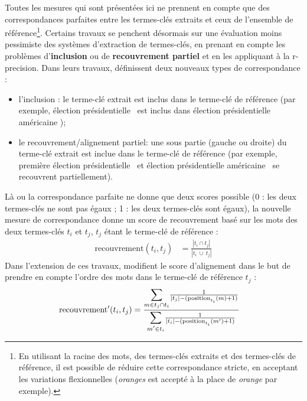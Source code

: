       Toutes les mesures qui sont présentées ici ne prennent en compte que des
      correspondances parfaites entre les termes-clés extraits et ceux de l'ensemble
      de référence\footnote{En utilisant la racine des mots, des termes-clés extraits et
      des termes-clés de référence, il est possible de réduire cette correspondance
      stricte, en acceptant les variations flexionnelles (\textit{oranges} est
      accepté à la place de \textit{orange} par exemple).}. Certains travaux se
      penchent désormais sur une évaluation moins pessimiste des systèmes
      d'extraction de termes-clés, en prenant en compte les problèmes
      d'\textbf{inclusion} ou de \textbf{recouvrement partiel}
      \citep{zesch2009rprecision, kim2010rprecision} et en les appliquant à la
      r-precision. Dans leurs travaux, \citet{zesch2009rprecision} définissent deux
      nouveaux types de correspondance :
      \begin{itemize}
        \item{l'inclusion : le terme-clé extrait est inclus dans le terme-clé de
              référence (par exemple, \og élection présidentielle \fg\ est inclus
              dans \og élection présidentielle américaine \fg);}
        \item{le recouvrement/alignement partiel: une sous partie (gauche ou
              droite) du terme-clé extrait est inclue dans le terme-clé de
              référence (par exemple, \og première élection présidentielle \fg\ et
              \og élection présidentielle américaine \fg\ se recouvrent
              partiellement).}
      \end{itemize}
      Là ou la correspondance parfaite ne donne que deux scores possible (0 : les
      deux termes-clés ne sont pas égaux ; 1 : les deux termes-clés sont égaux), la nouvelle
      mesure de correspondance donne un score de recouvrement basé sur les mots des
      deux termes-clés $t_i$ et $t_j$, $t_j$ étant le terme-clé de référence :
      \begin{align}
        \text{recouvrement}(t_{i}, t_{j}) &= \frac{|t_{i} \cap t_{j}|}{|t_{i}\ \cup\ t_{j}|}
      \end{align}
      Dans l'extension de ces travaux, \citet{kim2010rprecision} modifient le score
      d'alignement dans le but de prendre en compte l'ordre des mots dans le terme-clé
      de référence $t_j$ :
      \begin{align}
        \text{recouvrement}'(t_{i}, t_{j}) &= \frac{\mathlarger{\sum}_{m \in t_{j} \cap t_{i}} \frac{1}{|t_{j}| - (\text{position}_{t_i}(m) + 1)}}{\mathlarger{\sum}_{m' \in t_{i}} \frac{1}{|t_{i}| - (\text{position}_{t_i}(m') + 1)}}
      \end{align}

